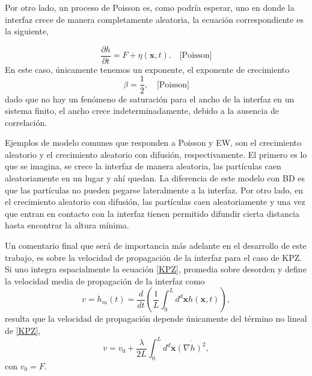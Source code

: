 Por otro lado, un proceso de Poisson es, como podría esperar, uno en donde la interfaz crece de manera completamente aleatoria, la ecuación correspondiente es la siguiente,

\begin{equation}
    \frac{\partial h}{\partial t} = F + \eta(\mathbf{x},t). \quad \text{[Poisson]}
    \label{Poisson}
\end{equation}  
En este caso, únicamente tenemos un exponente, el exponente de crecimiento
\begin{equation}
    \beta = \frac{1}{2}, \quad \text{[Poisson]}
\end{equation}
dado que no hay un fenómeno de saturación para el ancho de la interfaz en un sistema finito, el ancho crece indeterminadamente, debido a la ausencia de correlación.

Ejemplos de modelo comunes que responden a Poisson y EW, son el crecimiento aleatorio y el crecimiento aleatorio con difusión, respectivamente. El primero es lo que se imagina, se crece la interfaz de manera aleatoria, las partículas caen aleatoriamente en un lugar y ahí quedan. La diferencia de este modelo con BD es que las partículas no pueden pegarse lateralmente a la interfaz. Por otro lado, en el crecimiento aleatorio con difusión, las partículas caen aleatoriamente y una vez que entran en contacto con la interfaz tienen permitido difundir cierta distancia hasta encontrar la altura mínima.

Un comentario final que será de importancia más adelante en el desarrollo de este trabajo, es sobre la velocidad de propagación de la interfaz para el caso de KPZ. Si uno integra espacialmente la ecuación \ref{KPZ}, promedia sobre desorden y define la velocidad media de propagación de la interfaz como
\begin{equation}
    v = \dot{h}_m(t) = \frac{d}{dt} \left(\frac{1}{L} \int_{0}^{L}d^d\mathbf{x} h(\mathbf{x},t) \right),
\end{equation}
resulta que la velocidad de propagación depende únicamente del término no lineal de \ref{KPZ}, 
\begin{equation}
    v = v_0 + \frac{\lambda}{2L} \int_0^L d^d\mathbf{x} \overline{\left(\nabla h\right)^2},
    \label{v_kpz}
\end{equation}
con $v_0=F$.











